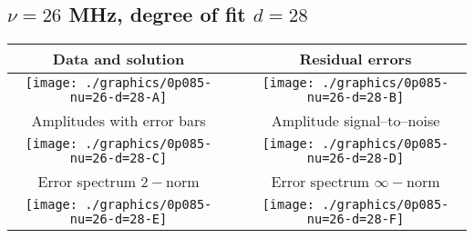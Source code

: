 

% 

\clearpage{}
\break{}

\subsection{$\nu = 26$ MHz, degree of fit $d = 28$}

\begin{table}[h]
    \begin{center}
        \begin{tabular}{ccc}
            Data and solution & \quad & Residual errors \\\hline
            \texttt{[image: ./graphics/0p085-nu=26-d=28-A]} &&
            \texttt{[image: ./graphics/0p085-nu=26-d=28-B]} \\[15pt]
            Amplitudes with error bars && Amplitude signal--to--noise \\\hline
            \texttt{[image: ./graphics/0p085-nu=26-d=28-C]} &&
            \texttt{[image: ./graphics/0p085-nu=26-d=28-D]} \\[15pt]
            Error spectrum $2-$norm && Error spectrum $\infty-$norm \\\hline
            \texttt{[image: ./graphics/0p085-nu=26-d=28-E]} &&
            \texttt{[image: ./graphics/0p085-nu=26-d=28-F]} \\[15pt]
        \end{tabular}
    \end{center}
\label{fig:elev=85, nu=26}
\end{table}



\endinput
